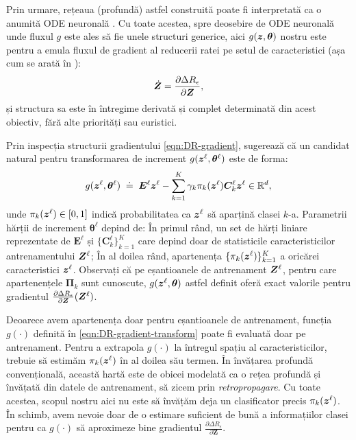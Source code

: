 \documentclass[../../book-main_ro.tex]{subfiles}
\begin{document}
Prin urmare, rețeaua (profundă) astfel construită poate fi interpretată ca o anumită ODE neuronală \cite{chen2018neural}. Cu toate acestea, spre deosebire de ODE neuronală unde fluxul $g$ este ales să fie unele structuri generice, aici $g(\bm{z}, \bm\theta)$ nostru este pentru a emula fluxul de gradient al reducerii ratei pe setul de caracteristici (așa cum se arată în ): 
\begin{equation*}
    \dot{\bm{Z}} = \frac{\partial \Delta R_{\epsilon}}{\partial \bm Z},
\end{equation*} 
și structura sa este în întregime derivată și complet determinată din acest obiectiv, fără alte priorități sau euristici.  

Prin inspecția structurii gradientului \eqref{eqn:DR-gradient}, sugerează că un candidat natural pentru transformarea de increment $g(\bm{z}^\ell, \bm \theta^\ell)$ este de forma:
\begin{equation}
    g(\bm{z}^\ell, \bm \theta^\ell) \; \doteq \; \bm E^\ell \bm{z}^\ell - \sum_{k=1}^K \gamma_{k} \pi_k(\bm{z}^\ell)\bm C_{k}^{\ell}  \bm{z}^{\ell}  \in \mathbb{R}^d,
    \label{eqn:DR-gradient-transform}
\end{equation}
unde $\pi_k(\bm{z}^\ell) \in [0,1]$ indică probabilitatea ca $\bm{z}^{\ell}$ să aparțină clasei $k$-a. Parametrii hărții de increment $\bm \theta^\ell$ depind de: În primul rând, un set de hărți liniare reprezentate de $\bm E^{\ell}$ și $\{ \bm C^{\ell}_{k}\}_{k=1}^{K}$ care depind doar de statisticile caracteristicilor antrenamentului $\bm{Z}^\ell$; În al doilea rând, apartenența $\{ \pi_k(\bm{z}^\ell)\}_{k=1}^K$ a oricărei caracteristici $\bm{z}^\ell$. 
Observați că pe eșantioanele de antrenament $\bm{Z}^\ell$, pentru care apartenențele $\bm \Pi_k$ sunt cunoscute, $g(\bm{z}^\ell, \bm \theta)$ astfel definit oferă exact valorile pentru gradientul $\frac{\partial \Delta R_{\epsilon}}{\partial \bm Z}(\bm{Z}^\ell)$.  


Deoarece avem apartenența doar pentru eșantioanele de antrenament, funcția $g(\cdot)$ definită în \eqref{eqn:DR-gradient-transform} poate fi evaluată doar pe antrenament. Pentru a extrapola $g(\cdot)$ la întregul spațiu al caracteristicilor, trebuie să estimăm $\pi_k(\bm{z}^\ell)$ în al doilea său termen. În învățarea profundă convențională, această hartă este de obicei modelată ca o rețea profundă și învățată din datele de antrenament, să zicem prin {\em retropropagare}. Cu toate acestea, scopul nostru aici nu este să învățăm deja un clasificator precis $\pi_{k}(\bm{z}^\ell)$. În schimb, avem nevoie doar de o estimare suficient de bună a informațiilor clasei pentru ca $g(\cdot)$ să aproximeze bine gradientul $\frac{\partial \Delta R_{\epsilon}}{\partial \bm Z}$. 
\end{document}
